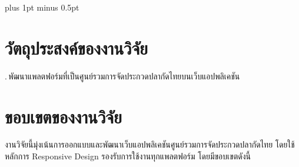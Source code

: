 
\clearpage
\thispagestyle{plain}

\begingroup
\fontsize{16pt}{19.2pt}\selectfont
\justifying
\XeTeXlinebreakskip=0pt plus 1pt minus 0.5pt
\setlength{\parindent}{1.5cm}
\setlength{\parskip}{0pt}

\section*{วัตถุประสงค์ของงานวิจัย}
.\,พัฒนาแพลตฟอร์มที่เป็นศูนย์รวมการจัดประกวดปลากัดไทยบนเว็บแอปพลิเคชัน

\vspace{\baselineskip} %

\section*{ขอบเขตของงานวิจัย}

\indent งานวิจัยนี้มุ่งเน้นการออกแบบและพัฒนาเว็บแอปพลิเคชันศูนย์รวมการจัดประกวดปลากัดไทย
โดยใช้หลักการ Responsive Design รองรับการใช้งานทุกแพลตฟอร์ม โดยมีขอบเขตดังนี้


\setlength{\LoneLabelSep}{0.5em}                                 %
\settowidth{\LoneLabelWidth}{9.}                                 %
\setlength{\LoneContentCol}{\dimexpr 1.5cm + \LoneLabelWidth + \LoneLabelSep\relax}

\setlength{\LtwoLabelSep}{0.5em}                                 %
\settowidth{\LtwoLabelWidth}{9.9.}                               %
\setlength{\ExtraAlign}{-2.8em}                                  %

\setlength{\LthreeLabelSep}{0.5em}                               %
\settowidth{\LthreeLabelWidth}{9.9.9.}                           %
\setlength{\NestedStep}{2em}                                     %


